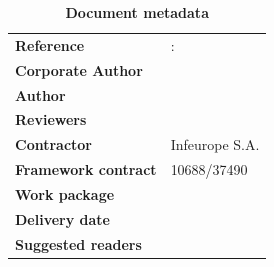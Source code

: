 \clearpage



\vspace*{\fill}

\textbf{\footnotesize \DelPreparation}

\begin{flushleft}
	\begin{table}[!b]
		\caption*{\large\textbf{Document metadata}}
		\footnotesize
		\begin{tabular}{p{3.6cm}p{\textwidth-5cm}}
			\textbf{Reference}          & \DelNumber: \DelTitle \\	
			\textbf{Corporate Author}   & \DelCorporateAuthor   \\
			\textbf{Author}             & \DelAuthor            \\
			\textbf{Reviewers}          & \DelReviewer          \\
			\textbf{Contractor}         & Infeurope S.A.        \\
			\textbf{Framework contract} & 10688/37490           \\	
			\textbf{Work package}       & \DelNumber            \\    				
			\textbf{Delivery date}      & \DelDate              \\    
			\textbf{Suggested readers}  & \DelReaders           \\
		\end{tabular}
	\end{table}
\end{flushleft}



\clearpage

\clearpage


\pagestyle{fancy}
\fancyhf{}
\fancyhead[RE]{\slshape\nouppercase{\rightmark}}      %
\fancyhead[LO]{\slshape\nouppercase{\leftmark}}     %
\cfoot{\thepage}



